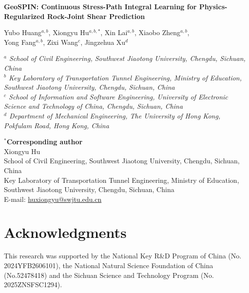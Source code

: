 \documentclass[10pt]{article}
\begin{document}
\begin{center}
{\LARGE\bfseries GeoSPIN: Continuous Stress-Path Integral Learning for Physics-Regularized Rock-Joint Shear Prediction\par}
\vspace{1.0em}
{\large
Yubo Huang$^{a,b}$, Xiongyu Hu$^{a,b,*}$, Xin Lai$^{a,b}$, Xiaobo Zheng$^{a,b}$,\\
Yong Fang$^{a,b}$,  Zixi Wang$^{c}$, Jingzehua Xu$^{d}$\par}
\vspace{1.0em}
\begin{minipage}{0.96\textwidth}
\itshape
$^{a}$ School of Civil Engineering, Southwest Jiaotong University, Chengdu, Sichuan, China\\
$^{b}$ Key Laboratory of Transportation Tunnel Engineering, Ministry of Education, Southwest Jiaotong University, Chengdu, Sichuan, China\\
$^{c}$ School of Information and Software Engineering, University of Electronic Science and Technology of China, Chengdu, Sichuan, China\\
$^{d}$ Department of Mechanical Engineering, The University of Hong Kong, Pokfulam Road, Hong Kong, China\\
\end{minipage}
\end{center}

\vspace{0.8em}
{
$^{*}$\textbf{Corresponding author}\\
Xiongyu Hu\\
School of Civil Engineering, Southwest Jiaotong University, Chengdu, Sichuan, China\\
Key Laboratory of Transportation Tunnel Engineering, Ministry of Education, Southwest Jiaotong University, Chengdu, Sichuan, China\\
E-mail: \href{mailto:huxiongyu@swjtu.edu.cn}{huxiongyu@swjtu.edu.cn}
}

\vspace{1.2em}
\section*{Acknowledgments}
This research was supported by the National Key R\&D Program of China (No. 2024YFB2606101), the National Natural Science Foundation of China (No.52478418) and the Sichuan Science and Technology Program (No. 2025ZNSFSC1294).
\end{document}
